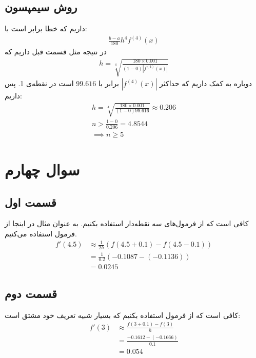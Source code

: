 \documentclass[]{article}
\begin{document}
\subsection*{روش سیمپسون}
داریم که خطا برابر است با:
\begin{gather*}
    \frac{b - a}{180}h^4 f^{(4)}(x)
\end{gather*}
در نتیجه مثل قسمت قبل داریم که
\begin{gather*}
    h = \sqrt[4]{\frac{180 \times 0.001}{(1 - 0) |f^{(4)}(x)|}}
\end{gather*}
دوباره به کمک
داریم که حداکثر
$|f^{(4)}(x)|$
برابر با
$99.616$
است در نقطه‌ی 1. پس داریم:
\begin{gather*}
    h = \sqrt[4]{\frac{180 \times 0.001}{(1 - 0) 99.616}} \approx 0.206\\
    n > \frac{1 - 0}{0.206} = 4.8544\\
    \implies \boxed{n \ge 5}
\end{gather*}
\section*{سوال چهارم}
\subsection*{قسمت اول}
کافی است که از فرمول‌های سه نقطه‌دار استفاده بکنیم. به عنوان مثال در اینجا از فرمول
استفاده می‌کنیم.
\begin{align*}
    f'(4.5) &\approx \frac{1}{2h} (f(4.5 + 0.1) - f(4.5 - 0.1))\\
    &=\frac{1}{0.2} (-0.1087 - (-0.1136))\\
    &=\boxed{0.0245}
\end{align*}
\subsection*{قسمت دوم}
کافی است که از فرمول
استفاده بکنیم که بسیار شبیه تعریف خود مشتق است:
\begin{align*}
    f'(3) &\approx \frac{f(3 + 0.1) - f(3)}{h}\\
    &=\frac{-0.1612 - (-0.1666)}{0.1}\\
    &=\boxed{0.054}
\end{align*}
\end{document}
